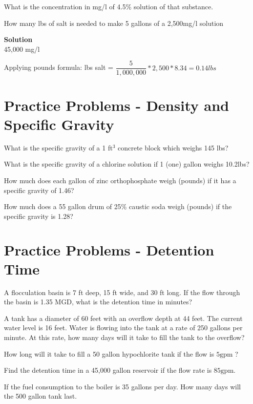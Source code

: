 What is the concentration in mg/l of  4.5\% solution of that substance.

How many lbs of salt is needed to make 5 gallons of a 2,500mg/l solution


\vspace{0.5cm}
\textbf{Solution}\\

45,000 mg/l

Applying pounds formula:  lbs salt = $\dfrac{5}{1,000,000}*2,500*8.34=\boxed{0.14lbs}$



\vspace{1cm}
\section*{Practice Problems - Density and Specific Gravity}


What is the specific gravity of a 1 ft$^3$ concrete block which weighs 145 lbs?

What is the specific gravity of a chlorine solution if 1 (one) gallon weighs 10.2lbs?

How much does each gallon of zinc orthophosphate weigh (pounds) if it has a specific gravity of 1.46?

How much does a 55 gallon drum of 25\% caustic soda weigh (pounds) if the specific gravity is 1.28?



\section*{Practice Problems - Detention Time}

A flocculation basin is 7 ft deep, 15 ft wide, and 30 ft long. If the flow through the basin is 1.35 MGD, what is the detention time in minutes?

A tank has a diameter of 60 feet with an overflow depth at 44 feet. The current water level is 16 feet. Water is flowing into the tank at a rate of 250 gallons per minute. At this rate, how many days will it take to fill the tank to the overflow?

How long will it take to fill a 50 gallon hypochlorite tank if the flow is $5 \mathrm{gpm}$ ?

Find the detention time in a 45,000 gallon reservoir if the flow rate is $85 \mathrm{gpm}$.

If the fuel consumption to the boiler is 35 gallons per day. How many days will the 500 gallon tank last.

